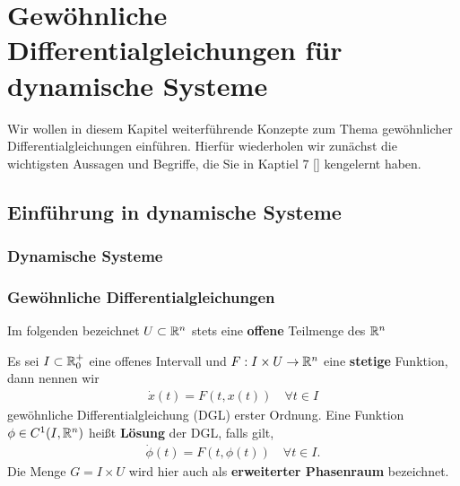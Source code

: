 \chapter{Gewöhnliche Differentialgleichungen für dynamische Systeme}
\label{\detokenize{ode/ode:gewohnliche-differentialgleichungen-fur-dynamische-systeme}}\label{\detokenize{ode/ode::doc}}
Wir wollen in diesem Kapitel weiterführende Konzepte zum Thema gewöhnlicher Differentialgleichungen einführen. Hierfür wiederholen wir zunächst die wichtigsten Aussagen und Begriffe, die Sie in Kaptiel 7 {[}{]} kengelernt haben.


\section{Einführung in dynamische Systeme}
\label{\detokenize{ode/motivation:einfuhrung-in-dynamische-systeme}}\label{\detokenize{ode/motivation::doc}}

\subsection{Dynamische Systeme}
\label{\detokenize{ode/motivation:dynamische-systeme}}

\subsection{Gewöhnliche Differentialgleichungen}
\label{\detokenize{ode/motivation:gewohnliche-differentialgleichungen}}
Im folgenden bezeichnet \(U\subset\mathbb{R}^n\) stets eine \textbf{offene} Teilmenge des \(\mathbb{R}^n\)
\label{ode/motivation:def:DGL}
\begin{definition}{}{}



Es sei \(I\subset\mathbb{R}^+_0\) eine offenes Intervall und \(F:I\times U\rightarrow\mathbb{R}^n\) eine \textbf{stetige} Funktion, dann nennen wir
\begin{align}\label{equation:ode/motivation:eq:DGL}
\dot{x}(t) = F(t, x(t))\quad\forall t\in I
\end{align}
gewöhnliche Differentialgleichung (DGL) erster Ordnung. Eine Funktion \(\phi\in C^1(I,\mathbb{R}^n)\) heißt \textbf{Lösung} der DGL, falls gilt,
\begin{align*}
\dot{\phi}(t) = F(t, \phi(t))\quad\forall t\in I.
\end{align*}
Die Menge \(G=I\times U\) wird hier auch als \textbf{erweiterter Phasenraum} bezeichnet.
\end{definition}

